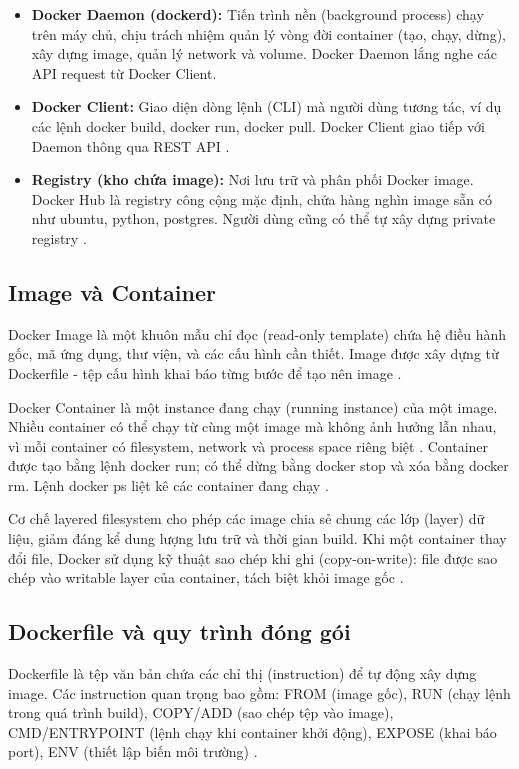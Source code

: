 \documentclass[../BTL.tex]{subfiles}
\begin{document}
\begin{itemize}
    \item \textbf{Docker Daemon (dockerd):} Tiến trình nền (background process) chạy trên máy chủ, chịu trách nhiệm quản lý vòng đời container (tạo, chạy, dừng), xây dựng image, quản lý network và volume. Docker Daemon lắng nghe các API request từ Docker Client.

    \item \textbf{Docker Client:} Giao diện dòng lệnh (CLI) mà người dùng tương tác, ví dụ các lệnh docker build, docker run, docker pull. Docker Client giao tiếp với Daemon thông qua REST API \cite{docker_official}.

    \item \textbf{Registry (kho chứa image):} Nơi lưu trữ và phân phối Docker image. Docker Hub là registry công cộng mặc định, chứa hàng nghìn image sẵn có như ubuntu, python, postgres. Người dùng cũng có thể tự xây dựng private registry \cite{docker_official,docker_primer}.
\end{itemize}

\subsection{Image và Container}
Docker Image là một khuôn mẫu chỉ đọc (read-only template) chứa hệ điều hành gốc, mã ứng dụng, thư viện, và các cấu hình cần thiết. Image được xây dựng từ Dockerfile - tệp cấu hình khai báo từng bước để tạo nên image \cite{docker_official,docker_primer}.

Docker Container là một instance đang chạy (running instance) của một image. Nhiều container có thể chạy từ cùng một image mà không ảnh hưởng lẫn nhau, vì mỗi container có filesystem, network và process space riêng biệt \cite{docker_official}. Container được tạo bằng lệnh docker run; có thể dừng bằng docker stop và xóa bằng docker rm. Lệnh docker ps liệt kê các container đang chạy \cite{docker_wikipedia}.

Cơ chế layered filesystem cho phép các image chia sẻ chung các lớp (layer) dữ liệu, giảm đáng kể dung lượng lưu trữ và thời gian build. Khi một container thay đổi file, Docker sử dụng kỹ thuật sao chép khi ghi (copy-on-write): file được sao chép vào writable layer của container, tách biệt khỏi image gốc \cite{docker_primer}.

\subsection{Dockerfile và quy trình đóng gói}
Dockerfile là tệp văn bản chứa các chỉ thị (instruction) để tự động xây dựng image. Các instruction quan trọng bao gồm: FROM (image gốc), RUN (chạy lệnh trong quá trình build), COPY/ADD (sao chép tệp vào image), CMD/ENTRYPOINT (lệnh chạy khi container khởi động), EXPOSE (khai báo port), ENV (thiết lập biến môi trường) \cite{docker_official,docker_primer}.
\end{document}

